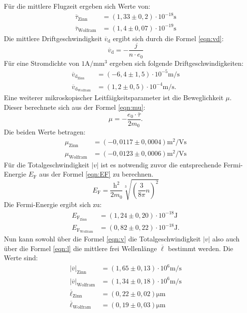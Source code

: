 Für die mittlere Flugzeit ergeben sich Werte von:
\begin{align*}
\overline{\tau}_\mathrm{Zinn}&=(1,33\pm0,2)\cdot10^{-18}\si{\second}\\
\overline{\tau}_\mathrm{Wolfram}&=(1,4\pm0,07)\cdot10^{-19}\si{\second}
\end{align*}
Die mittlere Driftgeschwindigkeit $\overline{v}_\mathrm{d}$ ergibt sich durch die Formel \eqref{eqn:vd}:
\begin{equation}
  \overline{v}_\mathrm{d}=-\frac{j}{n \cdot e_0}\label{eqn:vd}
\end{equation}
Für eine Stromdichte von $1\si{\ampere\per\milli\meter\tothe{3}}$ ergeben sich folgende Driftgeschwindigkeiten:
\begin{align}
\overline{v}_\mathrm{d_\mathrm{Zinn}}&=(-6,4\pm1,5)\cdot10^{-5}\si{\meter\per\second}\\
\overline{v}_\mathrm{d_\mathrm{Wolfram}}&=(1,2\pm0,5)\cdot10^{-4}\si{\meter\per\second}.
\end{align}
Eine weiterer mikroskopischer Leitfäigkeitsparameter ist die Beweglichkeit $\mu$.
Dieser berechnete sich aus der Formel \eqref{eqn:mu}:
\begin{equation}
\mu=-\frac{e_0\cdot\overline{\tau}}{2m_0}\label{eqn:mu}.
\end{equation}
Die beiden Werte betragen:
\begin{align*}
\mu_\mathrm{Zinn}&=(-0,0117\pm0,0004)\si{\square\meter\per\volt\second}\\
\mu_\mathrm{Wolfram}&=(-0,0123\pm0,0006)\si{\square\meter\per\volt\second}
\end{align*}
Für die Totalgeschwindigkeit $|v|$ ist es notwendig zuvor die entsprechende Fermi-Energie
$E_\mathrm{F}$ aus der Formel \eqref{eqn:EF} zu berechnen.
\begin{equation}
E_\mathrm{F}=\frac{\mathrm{h}^2}{2m_0}\sqrt[3]{\left(\frac{3}{8\pi}n\right)^2}\label{eqn:EF}
\end{equation}
Die Fermi-Energie ergibt sich zu:
\begin{align*}
E_\mathrm{F_\mathrm{Zinn}}&=(1,24\pm0,20)\cdot10^{-18}\si{\joule}\\
E_\mathrm{F_\mathrm{Wolfram}}&=(0,82\pm0,22)\cdot10^{-18}\si{\joule}.
\end{align*}
Nun  kann sowohl über die Formel \ref{eqn:v} die Totalgeschwindigkeit $|v|$ also auch
über die Formel \ref{eqn:l} die mittlere frei Wellenlänge  $\overline{\ell}$ bestimmt werden.
Die Werte sind:
\begin{align*}
  |\overline{v}|_\mathrm{Zinn}&=(1,65\pm0,13)\cdot10^{6}\si{\meter\per\second}\\
  |\overline{v}|_\mathrm{Wolfram}&=(1,34\pm0,18)\cdot10^{6}\si{\meter\per\second}\\
  \overline{\ell}_\mathrm{Zinn}&=(0,22\pm0,02)\si{\micro\meter}\\
  \overline{\ell}_\mathrm{Wolfram}&=(0,19\pm0,03)\si{\micro\meter}
\end{align*}
